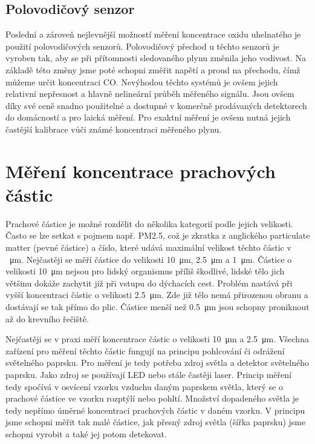 \subsection{Polovodičový senzor}

Poslední a zároveň nejlevnější možností měření koncentrace oxidu uhelnatého je použití polovodičových senzorů. Polovodičový přechod u těchto senzorů je vyroben tak, aby se při přítomnosti sledovaného plynu změnila jeho vodivost. Na základě této změny jsme poté schopni změřit napětí a proud na přechodu, čímž můžeme určit koncentraci CO. Nevýhodou těchto systémů je ovšem jejich relativní nepřesnost a hlavně nelineární průběh měřeného signálu. Jsou ovšem díky své ceně snadno použitelné a dostupné v komerčně prodávaných detektorech do domácností a pro laická měření. Pro exaktní měření je ovšem nutná jejich častější kalibrace vůči známé koncentraci měřeného plynu.

\section{Měření koncentrace prachových částic}

Prachové částice je možné rozdělit do několika kategorií podle jejich velikosti. Často se lze setkat s pojmem např. PM2.5, což je zkratka z anglického particulate matter (pevné částice) a číslo, které udává maximální velikost těchto částic v \SI{}{\micro\metre}. Nejčastěji se měří částice do velikosti \SI{10}{\micro\metre}, \SI{2,5}{\micro\metre} a \SI{1}{\micro\metre}. Částice o velikosti \SI{10}{\micro\metre} nejsou pro lidský organismus příliš škodlivé, lidské tělo jich většinu dokáže zachytit již při vstupu do dýchacích cest. Problém nastává při vyšší koncentraci částic o velikosti \SI{2,5}{\micro\metre}. Zde již tělo nemá přirozenou obranu a dostávají se tak přímo do plic. Částice menší než \SI{0,5}{\micro\metre} jsou schopny proniknout až do krevního řečiště.

Nejčastěji se v praxi měří koncentrace částic o velikosti \SI{10}{\micro\metre} a \SI{2,5}{\micro\metre}. Všechna zařízení pro měření těchto částic fungují na principu pohlcování či odrážení světelného paprsku. Pro měření je tedy potřeba zdroj světla a detektor světelného paprsku. Jako zdroj se používají LED nebo stále častěji laser. Princip měření tedy spočívá v osvícení vzorku vzduchu daným paprskem světla, který se o prachové částice ve vzorku rozptýlí nebo pohltí. Množství dopadeného světla je tedy nepřímo úměrné koncentraci prachových částic v daném vzorku. V principu jsme schopni měřit tak malé částice, jak přesný zdroj světla (šířka paprsku) jsme schopni vyrobit a také jej potom detekovat.

